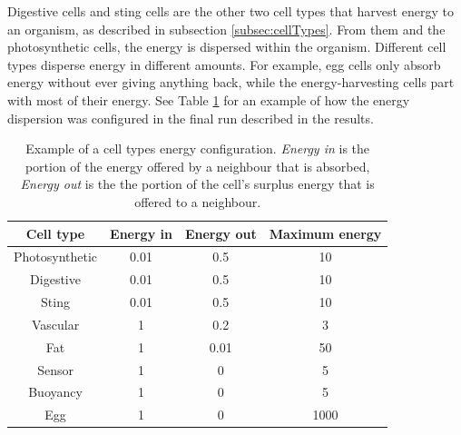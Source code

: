 Digestive cells and sting cells are the other two cell types that harvest energy to an organism, as described in subsection \ref{subsec:cellTypes}. From them and the photosynthetic cells, the energy is dispersed within the organism. Different cell types disperse energy in different amounts. For example, egg cells only absorb energy without ever giving anything back, while the energy-harvesting cells part with most of their energy. See Table \ref{tab:cellEnergies} for an example of how the energy dispersion was configured in the final run described in the results.

\begin{table}[H]
 \begin{tabular}{| c || c | c | c|} 
    \hline
     Cell type & Energy in & Energy out & Maximum energy \\ [0.5ex] 
     \hline\hline
     Photosynthetic & 0.01 & 0.5 & 10 \\ \hline
     Digestive & 0.01 & 0.5 & 10 \\ \hline
     Sting & 0.01 & 0.5 & 10 \\ \hline
     Vascular & 1 & 0.2 & 3 \\ \hline
     Fat & 1 & 0.01 & 50 \\ \hline
     Sensor & 1 & 0 & 5 \\ \hline
     Buoyancy & 1 & 0 & 5 \\ \hline
     Egg & 1 & 0 & 1000 \\ \hline
 \end{tabular}
\caption{Example of a cell types energy configuration. \emph{Energy in} is the portion of the energy offered by a neighbour that is absorbed,  \emph{Energy out} is the the portion of the cell's surplus energy that is offered to a neighbour.}
\label{tab:cellEnergies}
\end{table}